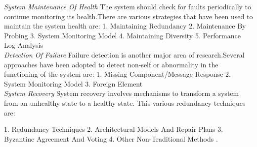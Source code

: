 \textit{System Maintenance Of Health}
The system should check for faults periodically to
continue monitoring its health.There are various strategies that have been used to maintain the system health are:
1. Maintaining Redundancy
2. Maintenance By Probing
3. System Monitoring Model
4. Maintaining Diversity
5. Performance Log Analysis\\

\textit{Detection Of Failure}
Failure detection is another major area of research.Several approaches have been adopted
to detect non-self or abnormality in the functioning of the system are:
1. Missing Component/Message Response
2. System Monitoring Model
3. Foreign Element\\

\textit{System Recovery}
System recovery involves mechanisms to transform a system from an unhealthy state to a healthy state. 
This various redundancy techniques are:

1. Redundancy Techniques
2. Architectural Models And Repair Plans
3. Byzantine Agreement And Voting
4. Other Non-Traditional Methods
\cite{Ghosh:SelfHealingSurvey:2007}.\\
